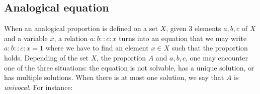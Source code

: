 \documentclass{ecai}
\begin{document}
\subsection{Analogical equation}
When an analogical proportion  is defined on a set $X$, given 3 elements
$a,b,c$ of $X$ and a variable $x$, a relation $a:b::c:x$ turns into an equation
that we may write $a:b::c:x=1$ where we have to find an element $x \in X$ such that
the proportion holds.
Depending of the set $X$, the proportion $A$ and $a,b,c$, one may encounter one
of the three situations: the equation is not solvable, has a unique
solution, or has multiple solutions. When there is at most one solution, we say
that $A$ is \textit{univocal}. For instance:
\end{document}
